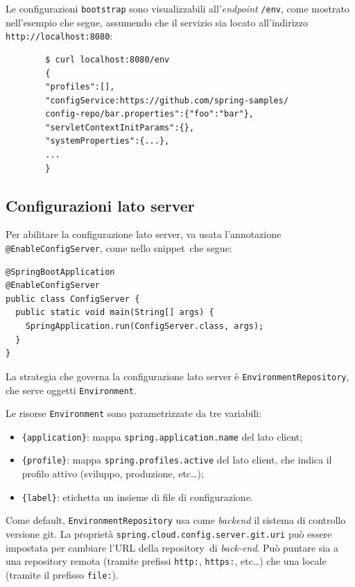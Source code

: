 Le configurazioni \texttt{bootstrap} sono visualizzabili all'\textit{endpoint} \texttt{/env}, come mostrato nell'esempio che segue, assumendo che il servizio sia locato all'indirizzo \texttt{http://localhost:8080}:

\begin{tcolorbox}
	\begin{verbatim}
		$ curl localhost:8080/env
		{
		"profiles":[],
		"configService:https://github.com/spring-samples/
		config-repo/bar.properties":{"foo":"bar"},
		"servletContextInitParams":{},
		"systemProperties":{...},
		...
		}
	\end{verbatim}
\end{tcolorbox}

\subsection{Configurazioni lato server} Per abilitare la configurazione lato server, va usata l'annotazione \texttt{@EnableConfigServer}, come nello \gls{snippet}\gloss\ che segue:

\begin{tcolorbox}
	\begin{lstlisting}
@SpringBootApplication
@EnableConfigServer
public class ConfigServer {
  public static void main(String[] args) {
    SpringApplication.run(ConfigServer.class, args);
  }
}
	\end{lstlisting}
\end{tcolorbox}

La strategia che governa la configurazione lato server è \texttt{EnvironmentRepository}, che serve oggetti \texttt{Environment}.

Le risorse \texttt{Environment} sono parametrizzate da tre variabili:
\begin{itemize}
	\item \texttt{\{application\}}: mappa \texttt{spring.application.name} del lato client;
	\item \texttt{\{profile\}}: mappa \texttt{spring.profiles.active} del lato client, che indica il profilo attivo (sviluppo, produzione, etc\dots);
	\item \texttt{\{label\}}: etichetta un insieme di file di configurazione.
\end{itemize}

Come default, \texttt{EnvironmentRepository} usa come \textit{backend} il sistema di controllo versione \gls{git}\gloss.
La proprietà \texttt{spring.cloud.config.server.git.uri} può essere impostata per cambiare l'URL della \gls{repository}\gloss\ di \textit{back-end}.
Può puntare sia a una \gls{repository} remota (tramite prefissi \texttt{http:}, \texttt{https:}, etc\dots) che una locale (tramite il prefisso \texttt{file:}).

